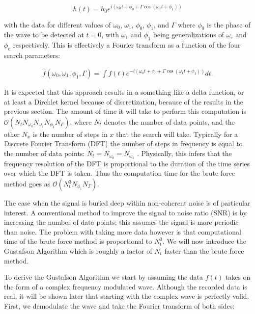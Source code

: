 \documentclass[onecolumn, groupedaddress, 10pt]{revtex4-1}
\begin{document}
\begin{equation}
h(t) = h_0 e^{i\left( \omega_0 t + \phi_0 + \Gamma \cos (\omega_1 t + \phi_1 ) \right)}
\end{equation}

with the data for different values of $\omega_0$, $\omega_1$, $\phi_0$, $\phi_1$, and $\Gamma$ where $\phi_0$ is the phase of the wave to be detected at $t=0$, with $\omega_1$ and $\phi_1$ being generalizations of $\omega_e$ and $\phi_e$ respectively.  This is effectively a Fourier transform as a function of the four search parameters:

\begin{align}
\hat{f}(\omega_0, \omega_1, \phi_1, \Gamma) = \int f(t) e^{-i\left( \omega_0 t + \phi_0 + \Gamma \cos (\omega_1 t + \phi_1 ) \right)} dt.
\end{align}

It is expected that this approach results in a something like a delta function, or at least a Dirchlet kernel because of discretization, because of the results in the previous section.  The amount of time it will take to perform this computation is $\mathcal{O} (N_tN_{\omega_0}N_{\omega_1}N_{\phi_1}N_\Gamma)$, where $N_t$ denotes the number of data points, and the other $N_x$ is the number of steps in $x$ that the search will take.  Typically for a Discrete Fourier Transform (DFT) the number of steps in frequency is equal to the number of data points: $N_t=N_{\omega_0}=N_{\omega_1}$ \cite{rader1968discrete} \cite[P. 251]{folland}.  Physically, this infers that the frequency resolution of the DFT is proportional to the duration of the time series over which the DFT is taken.  Thus the computation time for the brute force method goes as $\mathcal{O} (N_t^3N_{\phi_1}N_\Gamma)$.  

The case when the signal is buried deep within non-coherent noise is of particular interest.  A conventional method to improve the signal to noise ratio (SNR) is by increasing the number of data points;  this assumes the signal is more periodic than noise. The problem with taking more data however is that computational time of the brute force method is proportional to $N_t^3$.  We will now introduce the Gustafson Algorithm which is roughly a factor of $N_t$ faster than the brute force method.

To derive the Gustafson Algorithm we start by assuming the data $f(t)$ takes on the form of a complex frequency modulated wave. Although the recorded data is real, it will be shown later that starting with the complex wave is perfectly valid.  First, we demodulate the wave and take the Fourier transform of both sides:
\end{document}
